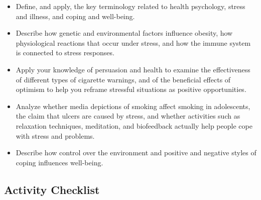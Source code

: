 \documentclass[
]{book}
\providecommand{\tightlist}{%
  \setlength{\itemsep}{0pt}\setlength{\parskip}{0pt}}
\begin{document}
\begin{itemize}
\tightlist
\item
  Define, and apply, the key terminology related to health psychology, stress and illness, and coping and well-being.\\
\item
  Describe how genetic and environmental factors influence obesity, how physiological reactions that occur under stress, and how the immune system is connected to stress responses.\\
\item
  Apply your knowledge of persuasion and health to examine the effectiveness of different types of cigarette warnings, and of the beneficial effects of optimism to help you reframe stressful situations as positive opportunities.\\
\item
  Analyze whether media depictions of smoking affect smoking in adolescents, the claim that ulcers are caused by stress, and whether activities such as relaxation techniques, meditation, and biofeedback actually help people cope with stress and problems.\\
\item
  Describe how control over the environment and positive and negative styles of coping influences well-being.
\end{itemize}

\hypertarget{activity-checklist-7}{%
\subsection*{Activity Checklist}\label{activity-checklist-7}}
\end{document}
